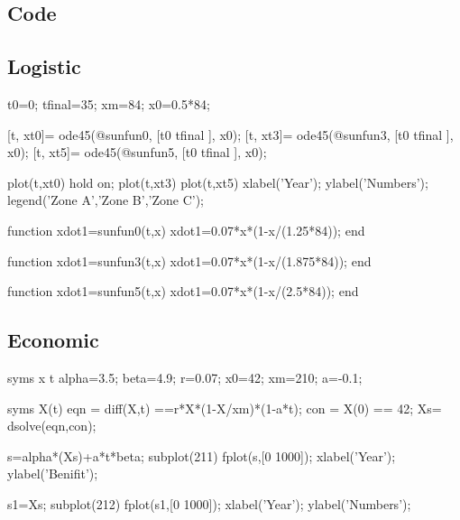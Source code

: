 \documentclass{mcmthesis}
\numberwithin{figure}{section}
\numberwithin{table}{section}
\numberwithin{equation}{section}
\begin{document}
\begin{appendices}
	
\section{Code}

\subsection{Logistic}

t0=0;
tfinal=35; %
xm=84;%
x0=0.5*84;%


[t, xt0]= ode45(@sunfun0, [t0 tfinal ], x0); %
[t, xt3]= ode45(@sunfun3, [t0 tfinal ], x0);
[t, xt5]= ode45(@sunfun5, [t0 tfinal ], x0);

plot(t,xt0)
hold on;
plot(t,xt3)
plot(t,xt5)
 xlabel('Year');
 ylabel('Numbers');
 legend('Zone A','Zone B','Zone C');

function xdot1=sunfun0(t,x)
xdot1=0.07*x*(1-x/(1.25*84));
end

function xdot1=sunfun3(t,x)
xdot1=0.07*x*(1-x/(1.875*84));
end

function xdot1=sunfun5(t,x)
xdot1=0.07*x*(1-x/(2.5*84));
end

\subsection{Economic}

syms x t    
alpha=3.5; %
beta=4.9; %
r=0.07;%
x0=42;%
xm=210;%
a=-0.1;%


syms X(t)    %
eqn = diff(X,t) ==r*X*(1-X/xm)*(1-a*t);  
con = X(0) == 42;
Xs= dsolve(eqn,con);


s=alpha*(Xs)+a*t*beta;
subplot(211)    %
 fplot(s,[0 1000]);
 xlabel('Year');
 ylabel('Benifit');

s1=Xs;         %
subplot(212)
fplot(s1,[0 1000]);
 xlabel('Year');
 ylabel('Numbers');


\end{appendices}
\end{document}

